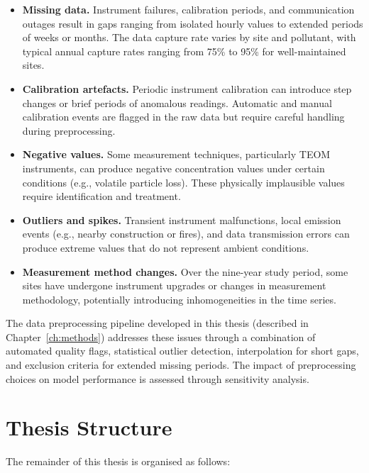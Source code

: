 \begin{itemize}
    \item \textbf{Missing data.} Instrument failures, calibration periods, and communication outages result in gaps ranging from isolated hourly values to extended periods of weeks or months. The data capture rate varies by site and pollutant, with typical annual capture rates ranging from 75\% to 95\% for well-maintained sites.
    
    \item \textbf{Calibration artefacts.} Periodic instrument calibration can introduce step changes or brief periods of anomalous readings. Automatic and manual calibration events are flagged in the raw data but require careful handling during preprocessing.
    
    \item \textbf{Negative values.} Some measurement techniques, particularly TEOM instruments, can produce negative concentration values under certain conditions (e.g., volatile particle loss). These physically implausible values require identification and treatment.
    
    \item \textbf{Outliers and spikes.} Transient instrument malfunctions, local emission events (e.g., nearby construction or fires), and data transmission errors can produce extreme values that do not represent ambient conditions.
    
    \item \textbf{Measurement method changes.} Over the nine-year study period, some sites have undergone instrument upgrades or changes in measurement methodology, potentially introducing inhomogeneities in the time series.
\end{itemize}

The data preprocessing pipeline developed in this thesis (described in Chapter~\ref{ch:methods}) addresses these issues through a combination of automated quality flags, statistical outlier detection, interpolation for short gaps, and exclusion criteria for extended missing periods. The impact of preprocessing choices on model performance is assessed through sensitivity analysis.

\section{Thesis Structure}
\label{sec:structure}

The remainder of this thesis is organised as follows:

